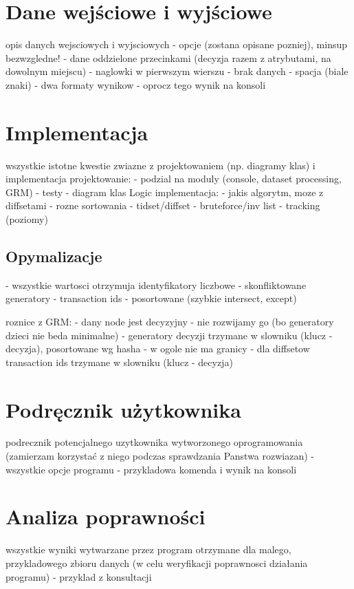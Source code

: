 \documentclass[a4paper,10pt]{article}
\begin{document}
\section{Dane wejściowe i wyjściowe} \label{sec:io}
opis danych wejsciowych i wyjsciowych
- opcje (zostana opisane pozniej), minsup bezwzgledne!
- dane oddzielone przecinkami (decyzja razem z atrybutami, na dowolnym miejscu)
- naglowki w pierwszym wierszu
- brak danych - spacja (biale znaki)
- dwa formaty wynikow
- oprocz tego wynik na konsoli



\section{Implementacja}
wszystkie istotne kwestie zwiazne z projektowaniem (np. diagramy klas) i implementacja
projektowanie:
- podzial na moduly (console, dataset processing, GRM)
- testy
- diagram klas Logic
implementacja:
- jakis algorytm, moze z diffsetami
- rozne sortowania
- tidset/diffset
- bruteforce/inv list
- tracking (poziomy)

\subsection{Opymalizacje}
- wszystkie wartosci otrzymuja identyfikatory liczbowe
- skonfliktowane generatory
- transaction ids - posortowane (szybkie intersect, except)

roznice z GRM:
- dany node jest decyzyjny - nie rozwijamy go (bo generatory dzieci nie beda minimalne)
- generatory decyzji trzymane w slowniku (klucz - decyzja), posortowane wg hasha
- w ogole nie ma granicy
- dla diffsetow transaction ids trzymane w slowniku (klucz - decyzja)



\section{Podręcznik użytkownika}
podrecznik potencjalnego uzytkownika wytworzonego oprogramowania
(zamierzam korzystać z niego podczas sprawdzania Panstwa rozwiazan)
- wszystkie opcje programu
- przykladowa komenda i wynik na konsoli



\section{Analiza poprawności}
wszystkie wyniki wytwarzane przez program otrzymane dla malego,
przykladowego zbioru danych (w celu weryfikacji poprawnosci działania
programu)
- przyklad z konsultacji
\end{document}
